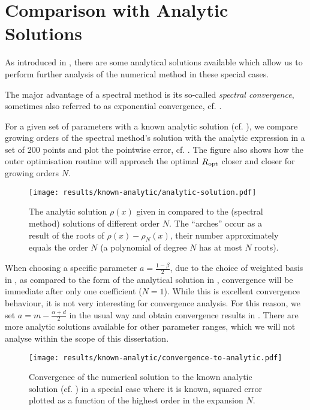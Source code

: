 \section{Comparison with Analytic Solutions}
As introduced in , there are some analytical solutions available which allow us to perform further analysis of the numerical method in these special cases.

The major advantage of a spectral method is its so-called \textit{spectral convergence}, sometimes also referred to as exponential convergence, cf. .


For a given set of parameters with a known analytic solution (cf. ), we compare growing orders of the spectral method's solution with the analytic expression in a set of 200 points and plot the pointwise error, cf. .
The figure also shows how the outer optimisation routine will approach the optimal $R_{\rm opt}$ closer and closer for growing orders $N$.

\begin{figure}[H]
  \centering
  \texttt{[image: results/known-analytic/analytic-solution.pdf]}
  \caption[Comparison with analytical solutions and error]{
    The analytic solution $\rho(x)$ given in  compared to the (spectral method) solutions of different order $N$.
    The ``arches'' occur as a result of the roots of $\rho(x) - \rho_N(x)$, their number approximately equals the order $N$ (a polynomial of degree $N$ has at most $N$ roots).
  }
  \label{fig:analytic-solution}
\end{figure}

When choosing a specific parameter $a = \frac{1-\beta}{2}$, due to the choice of weighted basis in , as compared to the form of the analytical solution in , convergence will be immediate after only one coefficient ($N=1$).
While this is excellent convergence behaviour, it is not very interesting for convergence analysis.
For this reason, we set $a = m - \frac{\alpha+d}{2}$ in the usual way and obtain convergence results in .
There are more analytic solutions available for other parameter ranges, which we will not analyse within the scope of this dissertation.

\begin{figure}[H]
  \centering
  \texttt{[image: results/known-analytic/convergence-to-analytic.pdf]}
  \caption[Convergence to analytic solution]{Convergence of the numerical solution to the known analytic solution (cf. ) in a special case where it is known, squared error plotted as a function of the highest order in the expansion $N$.}
  \label{fig:convergence-to-analytic}
\end{figure}
